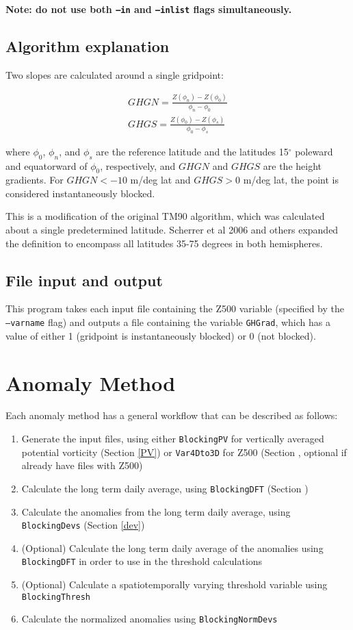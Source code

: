 \documentclass{article}
\begin{document}
\textbf{Note: do not use both \texttt{--in} and \texttt{--inlist} flags simultaneously.}

\subsection{Algorithm explanation}

Two slopes are calculated around a single gridpoint:

\begin{eqnarray}
GHGN=\frac{Z(\phi_n)-Z(\phi_0)}{\phi_n-\phi_0}\\
GHGS=\frac{Z(\phi_0)-Z(\phi_s)}{\phi_0-\phi_s}
\end{eqnarray}

\noindent where $\phi_0$, $\phi_n$, and $\phi_s$ are the reference latitude and the latitudes 15$^\circ$ poleward and equatorward of $\phi_0$, respectively, and $GHGN$ and $GHGS$ are the height gradients. For $GHGN<-10$ m/deg lat and $GHGS>0$ m/deg lat, the point is considered instantaneously blocked.

This is a modification of the original TM90 algorithm, which was calculated about a single predetermined latitude. Scherrer et al 2006 and others expanded the definition to encompass all latitudes 35-75 degrees in both hemispheres.


\subsection{File input and output}


This program takes each input file containing the Z500 variable (specified by the \texttt{--varname} flag) and outputs a file containing the variable \texttt{GHGrad}, which has a value of either 1 (gridpoint is instantaneously blocked) or 0 (not blocked).

\section{Anomaly Method}\label{anom}

Each anomaly method has a general workflow that can be described as follows:

\begin{enumerate}
\item Generate the input files, using either \texttt{BlockingPV} for vertically averaged potential vorticity (Section \ref{PV}) or \texttt{Var4Dto3D} for Z500 (Section , optional if already have files with Z500)
\item Calculate the long term daily average, using \texttt{BlockingDFT} (Section )
\item Calculate the anomalies from the long term daily average, using \texttt{BlockingDevs} (Section \ref{dev})
\item (Optional) Calculate the long term daily average of the anomalies using \texttt{BlockingDFT} in order to use in the threshold calculations
\item (Optional) Calculate a spatiotemporally varying threshold variable using \texttt{BlockingThresh}
\item Calculate the normalized anomalies using \texttt{BlockingNormDevs}
\end{enumerate}
\end{document}
